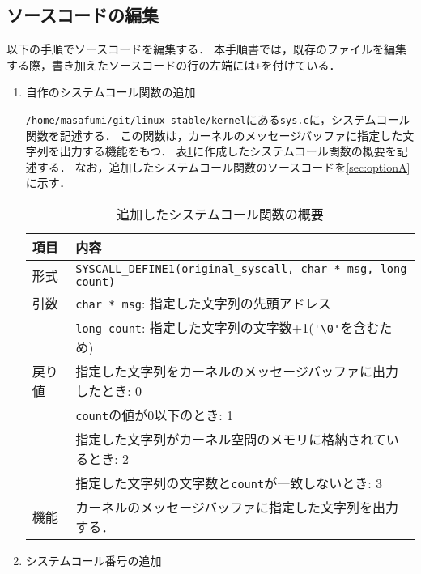 \documentclass[12pt]{jsarticle}
\begin{document}
\subsection{ソースコードの編集}\label{subsec:edit_sourcecode}
以下の手順でソースコードを編集する．
本手順書では，既存のファイルを編集する際，書き加えたソースコードの行の左端には\verb|+|を付けている．
\begin{enumerate}
  \item 自作のシステムコール関数の追加

\verb|/home/masafumi/git/linux-stable/kernel|にある\verb|sys.c|に，システムコール関数を記述する．
この関数は，カーネルのメッセージバッファに指定した文字列を出力する機能をもつ．
表\ref{tab:3}に作成したシステムコール関数の概要を記述する．
なお，追加したシステムコール関数のソースコードを\ref{sec:optionA}に示す．
\begin{table}[h]
  \begin{center}
    \caption{追加したシステムコール関数の概要}\label{tab:3}
    \begin{tabular}{l|l}
      \hline\hline
      \multicolumn{1}{l|}{項目} & \multicolumn{1}{l}{内容}\\
      \hline
      形式 & \verb|SYSCALL_DEFINE1(original_syscall, char * msg, long count)|\\
      引数 & \verb|char * msg|: 指定した文字列の先頭アドレス\\
          & \verb|long count|: 指定した文字列の文字数+1(\verb|'\0'|を含むため) \\
      戻り値 & 指定した文字列をカーネルのメッセージバッファに出力したとき: 0\\
      & \verb|count|の値が0以下のとき: 1\\
      & 指定した文字列がカーネル空間のメモリに格納されているとき: 2 \\
      & 指定した文字列の文字数と\verb|count|が一致しないとき: 3 \\
      機能 & カーネルのメッセージバッファに指定した文字列を出力する．\\
      \hline
    \end{tabular}
  \end{center}
\end{table}


\item\label{enum:add_syscall_number} システムコール番号の追加


\end{enumerate}
\end{document}
